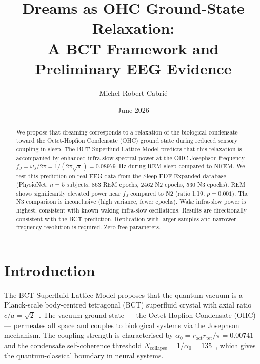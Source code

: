 \documentclass[aps,prl,twocolumn,showpacs,preprintnumbers]{revtex4-2}
\newcommand{\roct}{r_{\mathrm{oct}}}
\newcommand{\rtet}{r_{\mathrm{tet}}}
\newcommand{\azero}{\alpha_0}
\newcommand{\fJ}{f_J}
\newcommand{\omJ}{\omega_J}
\newcommand{\Ncol}{N_{\mathrm{collapse}}}
\begin{document}

\title{Dreams as OHC Ground-State Relaxation:\\
A BCT Framework and Preliminary EEG Evidence}

\author{Michel Robert Cabri\'e}

\date{June 2026}

\begin{abstract}
We propose that dreaming corresponds to a relaxation of the
biological condensate toward the Octet-Hopfion Condensate (OHC)
ground state during reduced sensory coupling in sleep. The BCT
Superfluid Lattice Model predicts that this relaxation is
accompanied by enhanced infra-slow spectral power at the OHC
Josephson frequency $\fJ = \omJ/2\pi = 1/(2\pi\sqrt{\pi})
= 0.08979$~Hz during REM sleep compared to NREM. We test this
prediction on real EEG data from the Sleep-EDF Expanded database
(PhysioNet; $n = 5$ subjects, 863 REM epochs, 2462 N2 epochs,
530 N3 epochs). REM shows significantly elevated power near $\fJ$
compared to N2 (ratio 1.19, $p = 0.001$). The N3 comparison is
inconclusive (high variance, fewer epochs). Wake infra-slow power
is highest, consistent with known waking infra-slow oscillations.
Results are directionally consistent with the BCT prediction.
Replication with larger samples and narrower frequency resolution
is required. Zero free parameters.
\end{abstract}

\maketitle

\section{Introduction}

The BCT Superfluid Lattice Model proposes that the quantum vacuum
is a Planck-scale body-centred tetragonal (BCT) superfluid crystal
with axial ratio $c/a = \sqrt{2}$~\cite{monograph}. The vacuum
ground state --- the Octet-Hopfion Condensate (OHC)~\cite{l36} ---
permeates all space and couples to biological systems via the
Josephson mechanism. The coupling strength is characterised by
$\azero = \roct\rtet/\pi = 0.00741$ and the condensate
self-coherence threshold $\Ncol = 1/\azero = 135$~\cite{l204},
which gives the quantum-classical boundary in neural systems.
\end{document}
